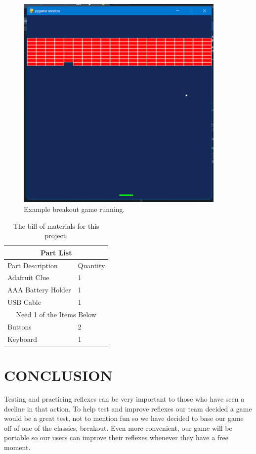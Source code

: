 \documentclass[12pt]{article}
\begin{document}
\begin{figure}[ht]
\centering
\includegraphics[width=4in]{images/Breakout_Screen.png}
\caption{Example breakout game running.}
\label{fig:Breakout_Screen}
\end{figure}

\begin{table}
\centering
\begin{tabular}{ |p{4cm}|p{1.5cm}|}
\hline
\multicolumn{2}{|c|}{Part List} \\
\hline
Part Description& Quantity \\
\hline
Adafruit Clue & 1 \\
AAA Battery Holder & 1 \\
USB Cable &1 \\
\hline
\multicolumn{2}{|c|}{Need 1 of the Items Below} \\
\hline
Buttons & 2 \\
Keyboard & 1 \\
\hline
\end{tabular}
\caption{The bill of materials for this project.}
\label{table:BOM}
\end{table}










\section{CONCLUSION}
Testing and practicing reflexes can be very important to those who have seen a decline in that action. To help test and improve reflexes our team decided a game would be a great test, not to mention fun so we have decided to base our game off of one of the classics, breakout. Even more convenient, our game will be portable so our users can improve their reflexes whenever they have a free moment. 
\end{document}
